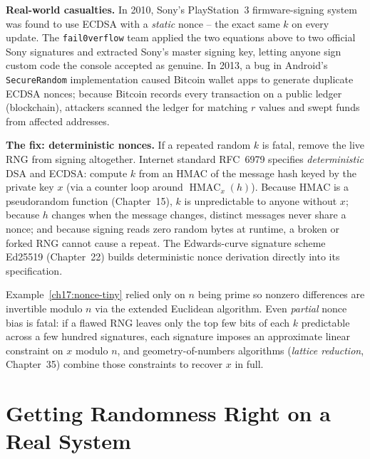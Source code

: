 \begin{attackbox}
\textbf{Real-world casualties.} In 2010, Sony's PlayStation~3 firmware-signing system was found to use ECDSA with a \emph{static} nonce -- the exact same $k$ on every update. The \texttt{fail0verflow} team applied the two equations above to two official Sony signatures and extracted Sony's master signing key, letting anyone sign custom code the console accepted as genuine. In 2013, a bug in Android's \texttt{SecureRandom} implementation caused Bitcoin wallet apps to generate duplicate ECDSA nonces; because Bitcoin records every transaction on a public ledger (blockchain), attackers scanned the ledger for matching $r$ values and swept funds from affected addresses.
\end{attackbox}

\begin{whybox}
\textbf{The fix: deterministic nonces.} If a repeated random $k$ is fatal, remove the live RNG from signing altogether. Internet standard RFC~6979 specifies \emph{deterministic} DSA and ECDSA: compute $k$ from an HMAC of the message hash keyed by the private key $x$ (via a counter loop around $\operatorname{HMAC}_x(h)$). Because HMAC is a pseudorandom function (Chapter~15), $k$ is unpredictable to anyone without $x$; because $h$ changes when the message changes, distinct messages never share a nonce; and because signing reads zero random bytes at runtime, a broken or forked RNG cannot cause a repeat. The Edwards-curve signature scheme Ed25519 (Chapter~22) builds deterministic nonce derivation directly into its specification.
\end{whybox}

\begin{connectionbox}
Example~\ref{ch17:nonce-tiny} relied only on $n$ being prime so nonzero differences are invertible modulo $n$ via the extended Euclidean algorithm. Even \emph{partial} nonce bias is fatal: if a flawed RNG leaves only the top few bits of each $k$ predictable across a few hundred signatures, each signature imposes an approximate linear constraint on $x$ modulo $n$, and geometry-of-numbers algorithms (\emph{lattice reduction}, Chapter~35) combine those constraints to recover $x$ in full.
\end{connectionbox}

\section{Getting Randomness Right on a Real System}
\label{ch17:getting-it-right}


